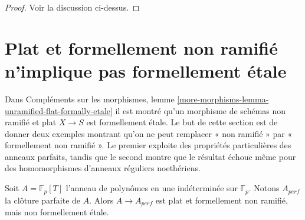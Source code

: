 \begin{proof}
Voir la discussion ci-dessus.
\end{proof}






\section[Plat et formellement non ramifié, non formellement \'etale]{Plat et formellement non ramifié n'implique pas formellement \'etale}
\label{section-flat-formally-unramified-not-formally-etale}

\noindent
Dans Compléments sur les morphismes, lemme
\ref{more-morphisms-lemma-unramified-flat-formally-etale}
il est montré qu'un morphisme de schémas non ramifié et plat $X \to S$
est formellement \'etale. Le but de cette section est de donner deux exemples
montrant qu'on ne peut remplacer « non ramifié » par « formellement non ramifié ».
Le premier exploite des propriétés particulières des anneaux parfaits, tandis que le
second montre que le résultat échoue même pour des homomorphismes d'anneaux réguliers noethériens.

\begin{lemma}
\label{lemma-perfect-closure-polynomial-ring}
Soit $A = \mathbb{F}_p[T]$ l'anneau de polynômes en une indéterminée sur
$\mathbb{F}_p$. Notons $A_{perf}$ la clôture parfaite de $A$.
Alors $A \rightarrow A_{perf}$ est plat et formellement non ramifié,
mais non formellement \'etale.
\end{lemma}

